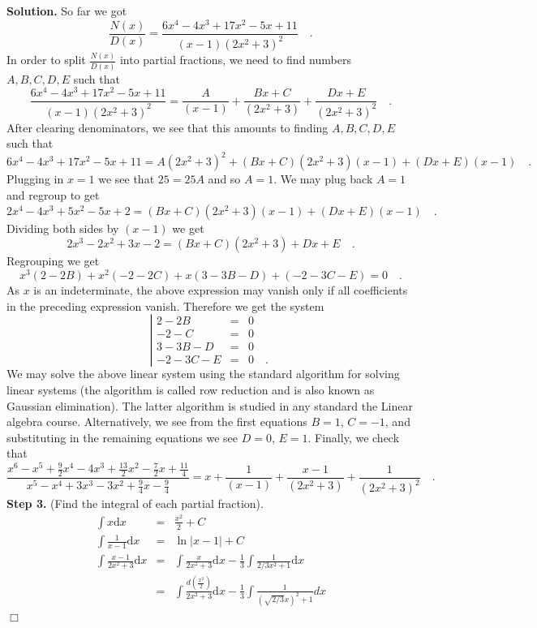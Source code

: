 \documentclass[12pt]{book}
\newcommand{\diff}{\text{d}}
\newenvironment{solution}{\textbf{Solution.} }{$\Box$}
\begin{document}
\begin{solution}
So far we got 
\[
\frac{N(x)}{D(x)}= \frac{6 x^{4}-4 x^{3}+17 x^{2}-5 x+11}{(x-1)(2x^2+3)^2}\quad .
\]
In order to split $\frac{N(x)}{D(x)}$ into partial fractions, we need to find numbers $A, B, C, D, E$ such that 
\[
\frac{6 x^{4}-4 x^{3}+17 x^{2}-5 x+11}{(x-1)(2x^2+3)^2}= \frac{A}{(x-1)}+\frac{Bx+C}{(2x^2+3)}+\frac{Dx+E}{(2x^2+3)^2}\quad .
\]
After clearing denominators, we see that this amounts to finding $A, B, C, D, E$ such that
\[
6 x^{4}-4 x^{3}+17 x^{2}-5 x+11= A(2x^2+3)^2+ (Bx+C)(2x^2+3)(x-1) + (Dx+E)(x-1)\quad .  
\]
Plugging in $x=1$ we see that $25=25A $ and so $A=1$. We may plug back $A=1$ and regroup to get
\[
2x^{4}-4x^{3}+5x^{2}-5x+2= (Bx+C)(2x^2+3)(x-1) + (Dx+E)(x-1)\quad .
\]
Dividing both sides by $(x-1)$ we get 
\[
2x^{3}-2x^{2}+3x-2= (Bx+C)(2x^2+3)+Dx+E\quad .
\]
Regrouping we get 
\[
x^{3}(2- 2B) + x^2(-2-2C)+x(3-3B-D)+(-2-3C-E)=0\quad.
\]
As $x$ is an indeterminate, the above expression may vanish only if all coefficients in the preceding expression vanish. Therefore we get the system
\[
\left| \begin{array}{rcl}
2-2B&=&0\\
-2-C&=&0\\
3-3B-D&=&0\\
-2-3C-E&=&0\quad .
\end{array}   \right.
\]
We may solve the above linear system using the standard algorithm for solving linear systems (the algorithm is called row reduction and is also known as Gaussian elimination). The latter algorithm is studied in any standard the Linear algebra course. Alternatively, we see from the first equations $B=1$, $C=-1$, and substituting in the remaining equations we see $D=0$, $E=1$. Finally, we check that 
\[
\frac{x^{6}-x^{5}+\frac{9}{2} x^{4}-4 x^{3}+\frac{13}{2} x^{2}-\frac{7}{2} x+\frac{11}{4}}{x^{5}-x^{4}+3 x^{3}-3 x^{2}+\frac{9}{4} x-\frac{9}{4}}
=x+\frac{1}{(x-1)}+\frac{x-1}{(2x^2+3)}+\frac{1}{(2x^2+3)^2}\quad .
\]
\textbf{Step 3.} (Find the integral of each partial fraction). 
\[
\begin{array}{rcl}
\displaystyle\int x \diff x &= &\frac{x ^2}2+C\\
\displaystyle\int \frac{1}{x-1} \diff x &=& \ln|x-1|+C\\
\displaystyle\int \frac{x-1}{2x^2+3} \diff x &=& \displaystyle \int\frac{x}{2x^2+3}\diff x -\frac{1}{3}\int \frac{1}{2/3x^2+1}\diff x\\
&=& \displaystyle  \int \frac{d(\frac{x^2}2)}{2x^2+3}\diff x-\frac{1}{3} \int \frac{1}{\left(\sqrt{2/3}x\right)^2+1} d x\\

\end{array}\]
\end{solution}
\end{document}
